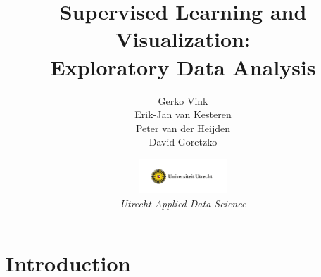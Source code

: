 \documentclass[xcolor=table,aspectratio=169]{beamer}
\title[SLV: EDA]{
	{\LARGE{Supervised Learning and Visualization}:\\\large{Exploratory Data Analysis}}
}
\institute{
	\footnotesize Department of Methodology and Statistics\\
}
\author[Vink | van Kesteren | van der Heijden | Goretzko]{Gerko Vink\\Erik-Jan van Kesteren\\Peter van der Heijden \\ David Goretzko}
\date{\includegraphics[height=1.3cm]{pics/uu-logo.png}\\
	
	\footnotesize{\emph{Utrecht Applied Data Science}}}
\begin{document}
\begin{frame}
\maketitle
\end{frame}


\section{Introduction}\subsection{}
\end{document}
